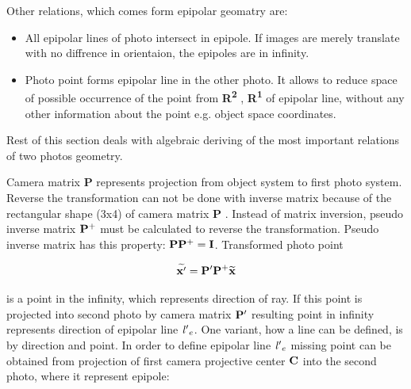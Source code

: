 \documentclass[a4paper,12pt]{article}
\newcommand{\ematr}[1]{
{\bf #1}
}
\newcommand{\evect}[1]{
{\bf #1}
}
\newcommand{\ehvect}[1]{
{\bf \widetilde{#1}}
}
\newcommand{\escal}[1]{
{\it #1}
}
\newcommand{\eucl}[1]{
{\bf R\textsuperscript{#1}}
}
\begin{document}

\noindent Other relations, which comes form epipolar geomatry are:

\begin{itemize}
\item All epipolar lines of  photo intersect in epipole. If images are merely translate with no diffrence in orientaion, 
the epipoles are in infinity.
\item Photo point forms epipolar line in the other photo. It allows to reduce space of possible occurrence of the point 
      from \eucl{2}, \eucl{1} of epipolar line, without any other information about the point e.g. object space coordinates. 
\end{itemize}

Rest of this section deals with algebraic deriving of the most important relations of two photos geometry. 



Camera matrix \ematr{P} represents projection from object system to first photo system.
Reverse the transformation can not be done with inverse matrix because of the rectangular shape (3x4) of 
camera matrix \ematr{P}. Instead of matrix inversion,  pseudo inverse matrix $\ematr{P}^{+}$ must be 
calculated to reverse the transformation. Pseudo inverse matrix has this property: $\ematr{P}\ematr{P}^{+} = \ematr{I}$.
Transformed photo point

\begin{equation}
\ehvect{x'} =  \ematr{P'}\ematr{P}^{+}\ehvect{x}
\end{equation}


is a point in the infinity, which represents direction of ray.
If this point is projected into second photo by camera matrix $\ematr{P'}$ resulting point in infinity 
represents direction of epipolar line $\escal{l'}_{e}$. One variant, how a line can be defined, is by direction 
and point. In order to define epipolar line $\escal{l'}_{e}$ missing point can be obtained from 
projection of first camera projective center $\evect{C}$ into the second photo, where it represent
epipole:
\end{document}
